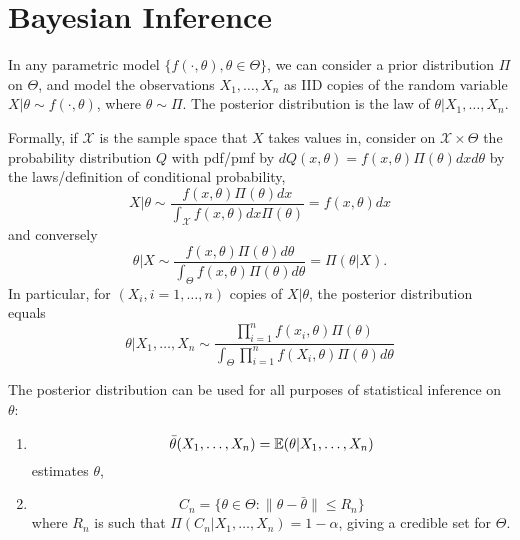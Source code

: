 \chapter{Bayesian Inference}
\label{cha:bayesian-inference}

In any parametric model $\{ f(\cdot, \theta), \theta \in \Theta \}$,
we can consider a prior distribution $\Pi$ on $\Theta$, and model the
observations $X_{1}, \dots, X_{n}$ as IID copies of the random
variable $X|\theta \sim f(\cdot, \theta)$, where $\theta \sim \Pi$.
The posterior distribution is the law of $\theta | X_{1}, \dots, X_{n}$.

Formally, if $\mathcal{X}$ is the sample space that $X$ takes values
in, consider on $\mathcal{X} \times \Theta$ the probability
distribution $Q$ with pdf/pmf by $dQ(x, \theta) = f(x, \theta)
\Pi(\theta) dx d\theta$ by the laws/definition of conditional
probability,
\begin{equation}
  \label{eq:100}
  X|\theta \sim \frac{f(x, \theta) \Pi(\theta)
    dx}{\int_{\mathcal{X}}f(x, \theta) dx \Pi(\theta)} = f(x, \theta) dx
\end{equation} and conversely
\begin{equation}
  \label{eq:100}
  \theta | X \sim \frac{f(x, \theta) \Pi(\theta)
    d\theta}{\int_{\Theta} f(x, \theta) \Pi(\theta) d\theta} =
  \Pi(\theta | X).
\end{equation} In particular, for $(X_{i}, i = 1, \dots, n)$ \iid
copies of $X|\theta$, the posterior distribution equals
\begin{equation}
  \label{eq:100}
  \theta | X_{1}, \dots, X_{n} \sim \frac{\prod_{i=1}^{n} f(x_{i},
    \theta) \Pi(\theta)}{\int_{\Theta} \prod_{i=1}^{n}f(X_{i}, \theta)
  \Pi(\theta) d\theta}
\end{equation}


The posterior distribution can be used for all purposes of statistical
inference on $\theta$:

\begin{enumerate}
\item
  \begin{equation}
    \label{eq:100}
    \bar \theta(X_{1}, \dots, X_{n}) = \E{\theta | X_{1}, \dots, X_{n}}
  \end{equation} estimates $\theta$,
\item
  \begin{equation}
    \label{eq:100}
    C_{n} = \{ \theta \in \Theta : \| \theta - \bar \theta \| \leq
    R_{n} \}
  \end{equation} where $R_{n}$ is such that $\Pi(C_{n}| X_{1}, \dots,
  X_{n}) = 1 - \alpha$, giving a credible set for $\Theta$.
\end{enumerate}

